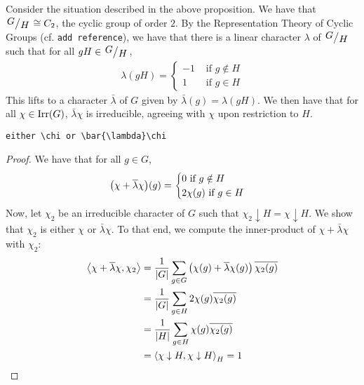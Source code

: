 \begin{remark}
    Consider the situation described in the above proposition. We have that $\quotient{G}{H} \cong C_2$, the cyclic group of order $2$. By the Representation Theory of Cyclic Groups (cf. \verb|add reference|), we have that there is a linear character $\lambda$ of $\quotient{G}{H}$ such that for all $gH \in \quotient{G}{H}$,
    \begin{align*}
        \lambda(gH) =
        \begin{cases}
            -1 & \text{ if } g \notin H \\
            1 & \text{ if } g \in H
        \end{cases}
    \end{align*}
    This lifts to a character $\bar{\lambda}$ of $G$ given by $\bar{\lambda}(g) = \lambda(gH)$. We then have that for all $\chi \in \operatorname{Irr}\!\left( G \right)$, $\bar{\lambda} \chi$ is irreducible, agreeing with $\chi$ upon restriction to $H$.
\end{remark}
\begin{lemma}
    \verb|either \chi or \bar{\lambda}\chi|
\end{lemma}
\begin{proof}
    We have that for all $g \in G$,
    \begin{align*}
        \left( \chi + \overline{\lambda}\chi \right)\!(g) =
        \begin{cases}
            0 \text{ if } g \notin H \\
            2\chi(g) \text{ if } g \in H
        \end{cases}
    \end{align*}
    Now, let $\chi_2$ be an irreducible character of $G$ such that $\chi_2 \downarrow H = \chi \downarrow H$. We show that $\chi_2$ is either $\chi$ or $\bar{\lambda} \chi$. To that end, we compute the inner-product of $\chi + \bar{\lambda}\chi$ with $\chi_2$:
    \begin{align*}
        \left\langle \chi + \overline{\lambda}\chi, \chi_2 \right\rangle &= \frac{1}{\left\lvert G \right\rvert} \sum_{g \in G} \left( \chi(g) + \overline{\lambda}\chi(g) \right) \overline{\chi_2(g)} \\
        &= \frac{1}{\left\lvert G \right\rvert} \sum_{g \in H} 2\chi(g) \overline{\chi_2(g)} \\
        &= \frac{1}{\left\lvert H \right\rvert} \sum_{g \in H} \chi(g) \overline{\chi_2(g)} \\
        &= \left\langle \chi \downarrow H, \chi \downarrow H \right\rangle_H = 1
    \end{align*}
\end{proof}

